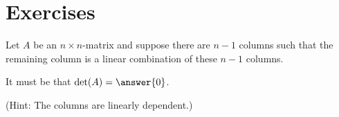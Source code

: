 \documentclass{ximera}
\author{Zack Reed}
\begin{document}
\section*{Exercises}




\begin{problem}
  Let $A$ be an $n\times n$-matrix and suppose there are $n-1$ columns
  such that the remaining column is a linear combination of these $n-1$
  columns. 
  
  It must be that $\det(A) = \answer{0}$.

  (Hint: The columns are linearly dependent.)
\end{problem}
\end{document}
